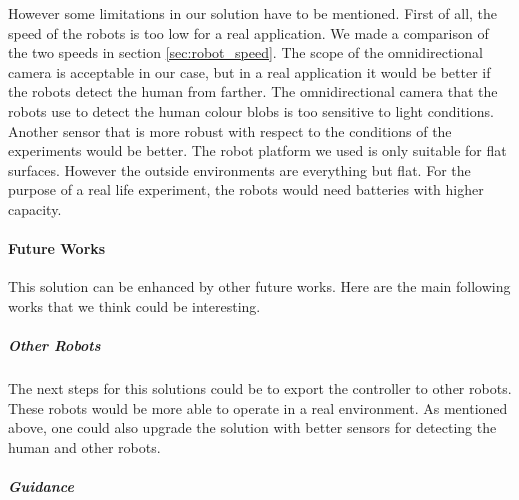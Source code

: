 \documentclass[oneside, a4paper, 12pt]{memoir}
\begin{document}
	However some limitations in our solution have to be mentioned. First of all, the speed of the robots is too low for a real application. We made a comparison of the two speeds in section \ref{sec:robot_speed}. The scope of the omnidirectional camera is acceptable in our case, but in a real application it would be better if the robots detect the human from farther. The omnidirectional camera that the robots use to detect the human colour blobs is too sensitive to light conditions. Another sensor that is more robust with respect to the conditions of the experiments would be better. The robot platform we used is only suitable for flat surfaces. However the outside environments are everything but flat. For the purpose of a real life experiment, the robots would need batteries with higher capacity.
	
	\paragraph{Future Works}

		
			This solution can be enhanced by other future works. Here are the main following works that we think could be interesting.
	
		\subparagraph{Other Robots}
			
			The next steps for this solutions could be to export the controller to other robots. These robots would be more able to operate in a real environment. As mentioned above, one could also upgrade the solution with better sensors for detecting the human and other robots.
			
		\subparagraph{Guidance}
		
\end{document}
